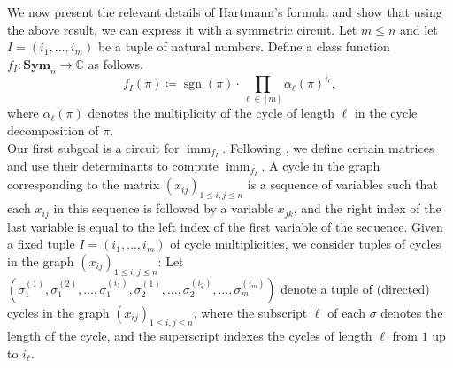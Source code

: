 \documentclass[10pt,a4paper]{article}
\theoremstyle{definition}
\theoremstyle{plain}
\theoremstyle{remark}
\newcommand{\Sym}{\mathbf{Sym}}
\DeclareMathOperator{\imm}{imm}
\DeclareMathOperator{\sgn}{sgn}
\begin{document}
We now present the relevant details of Hartmann's formula and show that using the above result, we can express it with a symmetric circuit. 
Let $m \leq n$ and let $I = (i_1,\dots ,i_m)$ be a tuple of natural numbers. Define a class function $f_I\colon \Sym_n \to \mathbb{C}$ as follows. 
\[
f_I(\pi) \coloneqq \sgn(\pi)\cdot \prod_{\ell \in [m]} \alpha_\ell(\pi)^{i_\ell}, 
\]
where $\alpha_\ell(\pi)$ denotes the multiplicity of the cycle of length $\ell$ in the cycle decomposition of $\pi$.\\ 

Our first subgoal is a circuit for $\imm_{f_I}$. Following \cite{hartmann1985complexity}, we define certain matrices and use their determinants to compute $\imm_{f_I}$.
A cycle in the graph corresponding to the matrix $(x_{ij})_{1 \leq i,j \leq n}$ is a sequence of variables such that each $x_{ij}$ in this sequence is followed by a variable $x_{jk}$, and the right index of the last variable is equal to the left index of the first variable of the sequence. 
Given a fixed tuple $I = (i_1,\dots ,i_m)$ of cycle multiplicities, we consider tuples of cycles in the graph $(x_{ij})_{1 \leq i,j \leq n}$:
Let $(\sigma_1^{(1)}, \sigma_1^{(2)}, \dots , \sigma_1^{(i_1)}, \sigma_2^{(1)}, \dots , \sigma_2^{(i_2)}, \dots , \sigma_m^{(i_m)})$ denote a tuple of (directed) cycles in the graph $(x_{ij})_{1\leq i,j \leq n}$, where the subscript $\ell$ of each $\sigma$ denotes the length of the cycle, and the superscript indexes the cycles of length $\ell$ from $1$ up to $i_\ell$. 
\end{document}
